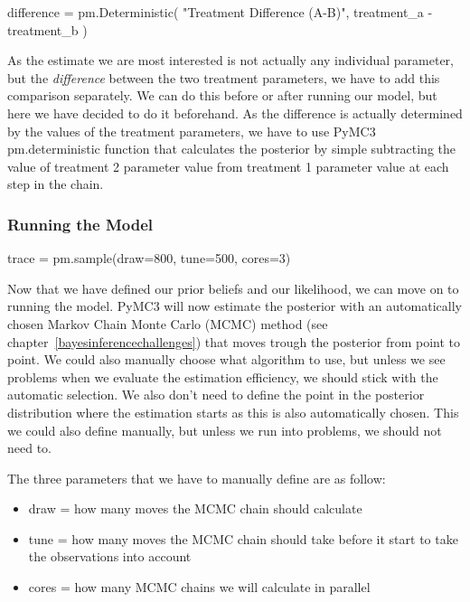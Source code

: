 \documentclass[12pt,a4paper,leqno]{report}
\theoremstyle{plain}
\theoremstyle{definition}
\theoremstyle{remark}
\begin{document}
\bigskip
\begin{pyverbatim}
    difference = pm.Deterministic(
        "Treatment Difference (A-B)", treatment_a - treatment_b
    )
\end{pyverbatim}
\bigskip

As the estimate we are most interested is not actually any individual parameter, but the
\emph{difference} between the two treatment parameters, we have to add this comparison separately.
We can do this before or after running our model, but here we have decided to do it
beforehand. As the difference is actually determined by the values of the treatment
parameters, we have to use PyMC3 pm.deterministic function that calculates the posterior
by simple subtracting the value of treatment 2 parameter value from treatment 1
parameter value at each step in the chain.

\subsubsection{Running the Model}

\bigskip
\begin{pyverbatim}
trace = pm.sample(draw=800, tune=500, cores=3)
\end{pyverbatim}
\bigskip

Now that we have defined our prior beliefs and our likelihood, we can move on to running the
model. PyMC3 will now estimate the posterior with an automatically chosen Markov Chain
Monte Carlo (MCMC) method (see chapter\ \ref{bayesinferencechallenges})
that moves trough the posterior from point to point. We could also manually choose what
algorithm to use, but unless we see problems when we evaluate the estimation efficiency,
we should stick with the automatic selection. We also don't need to define the point in the
posterior distribution where the estimation starts as this is also automatically chosen. This
we could also define manually, but unless we run into problems, we should not need to.

The three parameters that we have to manually define are as follow:

\begin{itemize}
    \item[] draw = how many moves the MCMC chain should calculate
    \item[] tune = how many moves the MCMC chain should take before it start to
    take the observations into account
    \item[] cores = how many MCMC chains we will calculate in parallel
\end{itemize}
\end{document}
